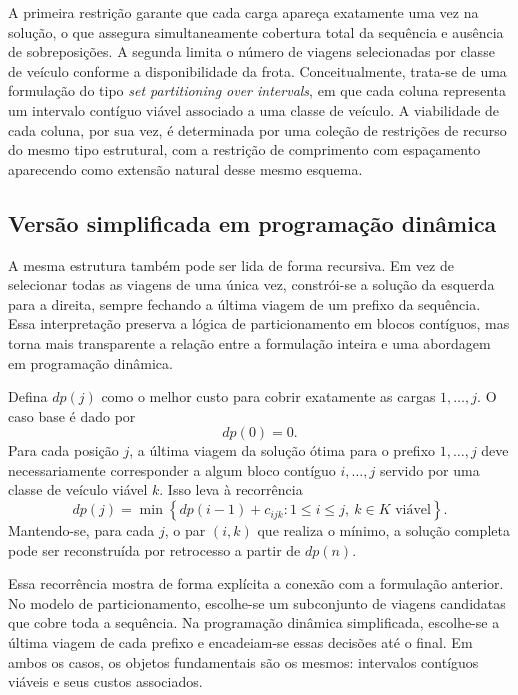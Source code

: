 A primeira restrição garante que cada carga apareça exatamente uma vez na
solução, o que assegura simultaneamente cobertura total da sequência e ausência
de sobreposições. A segunda limita o número de viagens selecionadas por classe
de veículo conforme a disponibilidade da frota. Conceitualmente, trata-se de uma
formulação do tipo \emph{set partitioning over intervals}, em que cada coluna
representa um intervalo contíguo viável associado a uma classe de veículo. A
viabilidade de cada coluna, por sua vez, é determinada por uma coleção de
restrições de recurso do mesmo tipo estrutural, com a restrição de comprimento
com espaçamento aparecendo como extensão natural desse mesmo esquema.

\subsection{Versão simplificada em programação dinâmica}

A mesma estrutura também pode ser lida de forma recursiva. Em vez de selecionar
todas as viagens de uma única vez, constrói-se a solução da esquerda para a
direita, sempre fechando a última viagem de um prefixo da sequência. Essa
interpretação preserva a lógica de particionamento em blocos contíguos, mas
torna mais transparente a relação entre a formulação inteira e uma abordagem em
programação dinâmica.

Defina \(dp(j)\) como o melhor custo para cobrir exatamente as cargas
\(1,\dots,j\). O caso base é dado por
{
\everymath{\normalcolor}
\[
dp(0) = 0.
\]
}
Para cada posição \(j\), a última viagem da solução ótima para o prefixo
\(1,\dots,j\) deve necessariamente corresponder a algum bloco contíguo
\(i,\dots,j\) servido por uma classe de veículo viável \(k\). Isso leva à
recorrência
{
\everymath{\normalcolor}
\[
dp(j) =
\min \left\{ dp(i-1) + c_{ijk} : 1 \le i \le j,\ k \in K \text{ viável} \right\}.
\]
}
Mantendo-se, para cada \(j\), o par \((i,k)\) que realiza o mínimo, a solução
completa pode ser reconstruída por retrocesso a partir de \(dp(n)\).

Essa recorrência mostra de forma explícita a conexão com a formulação anterior.
No modelo de particionamento, escolhe-se um subconjunto de viagens candidatas
que cobre toda a sequência. Na programação dinâmica simplificada, escolhe-se a
última viagem de cada prefixo e encadeiam-se essas decisões até o final. Em
ambos os casos, os objetos fundamentais são os mesmos: intervalos contíguos
viáveis e seus custos associados.

